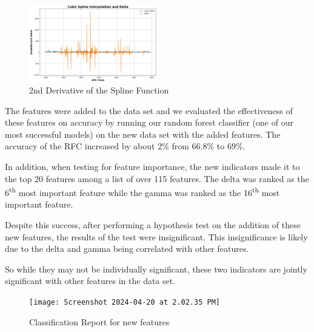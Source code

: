 \documentclass[11pt]{article}
\begin{document}
\begin{figure}[H]
    \centering
    \includegraphics[width=0.5\textwidth]{pic3 (1).jpg} %
     \caption{2nd Derivative of the Spline Function}
    \label{fig:example}
\end{figure}


The features were added to the data set and we evaluated the effectiveness of these features on accuracy by running our random forest classifier (one of our most successful models) on the new data set with the added features. The accuracy of the RFC increased by about 2\% from 66.8\% to 69\%. 

In addition, when testing for feature importance, the new indicators made it to the top 20 features among a list of over 115 features. The delta was ranked as the 6\textsuperscript{th} most important feature while the gamma was ranked as the 16\textsuperscript{th} most important feature. 

Despite this success, after performing a hypothesis test on the addition of these new features, the results of the test were insignificant. This insignificance is likely due to the delta and gamma being correlated with other features. 

So while they may not be individually significant, these two indicators are jointly significant with other features in the data set. 

\begin{figure}[H]
    \centering
    \texttt{[image: Screenshot 2024-04-20 at 2.02.35 PM]} %
    \caption{Classification Report for new features}
    \label{fig:example}
\end{figure}
\end{document}
